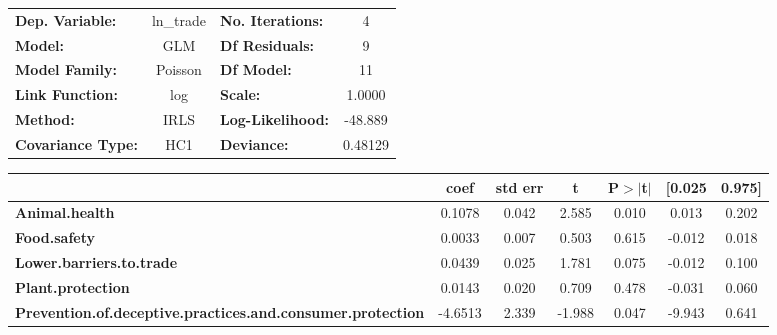 \begin{center}
\begin{tabular}{lclc}
\toprule
\textbf{Dep. Variable:}                                            &   ln\_trade   & \textbf{  No. Iterations:    } &     4       \\
\textbf{Model:}                                                    &      GLM      & \textbf{  Df Residuals:      } &     9       \\
\textbf{Model Family:}                                             &    Poisson    & \textbf{  Df Model:          } &     11      \\
\textbf{Link Function:}                                            &      log      & \textbf{  Scale:             } &    1.0000   \\
\textbf{Method:}                                                   &      IRLS     & \textbf{  Log-Likelihood:    } &   -48.889   \\
\textbf{Covariance Type:}                                          &      HC1      & \textbf{  Deviance:          } &   0.48129   \\
\bottomrule
\end{tabular}
\begin{tabular}{lcccccc}
                                                                   & \textbf{coef} & \textbf{std err} & \textbf{t} & \textbf{P$> |$t$|$} & \textbf{[0.025} & \textbf{0.975]}  \\
\midrule
\textbf{Animal.health}                                             &       0.1078  &        0.042     &     2.585  &         0.010        &        0.013    &        0.202     \\
\textbf{Food.safety}                                               &       0.0033  &        0.007     &     0.503  &         0.615        &       -0.012    &        0.018     \\
\textbf{Lower.barriers.to.trade}                                   &       0.0439  &        0.025     &     1.781  &         0.075        &       -0.012    &        0.100     \\
\textbf{Plant.protection}                                          &       0.0143  &        0.020     &     0.709  &         0.478        &       -0.031    &        0.060     \\
\textbf{Prevention.of.deceptive.practices.and.consumer.protection} &      -4.6513  &        2.339     &    -1.988  &         0.047        &       -9.943    &        0.641     \\

\end{tabular}
\end{center}
